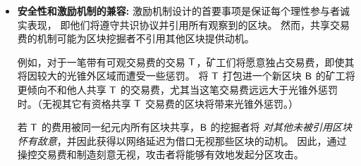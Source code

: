 	\begin{itemize}
		\item {\bf 安全性和激励机制的兼容:} 
		激励机制设计的首要事项是保证每个理性参与者诚实表现，
		即他们将遵守共识协议并引用所有观察到的区块。
		然而，共享交易费的机制可能为区块挖掘者不引用其他区块提供动机。

		例如，对于一笔带有可观交易费的交易 $\textsf{T}$，矿工们将愿意独占交易费，即使其将因较大的光锥外区域而遭受一些惩罚。
		将 $\textsf{T}$ 打包进一个新区块 $\textsf{B}$ 的矿工将更倾向不和他人共享 $\textsf{T}$ 的交易费，尤其当这笔交易费远远大于光锥外惩罚时。（无视其它有资格共享 $\textsf{T}$ 交易费的区块将带来光锥外惩罚。）

		若 $\textsf{T}$ 的费用被同一纪元内所有区块共享，$\textsf{B}$ 的挖掘者将 \emph{对其他未被引用区块怀有敌意}，并因此获得以网络延迟为借口无视那些区块的动机。
		因此，通过操控交易费和制造刻意无视，攻击者将能够有效地发起分区攻击。


\end{itemize}
